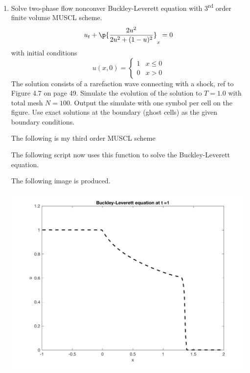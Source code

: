\documentclass[11pt, oneside]{article}
\begin{document}
\begin{enumerate}
  \item %
    Solve two-phase flow nonconver Buckley-Leverett equation with
    3\textsuperscript{rd} order finite volume MUSCL scheme.
    \[
      u_t + \p{\frac{2u^2}{2u^2 + (1 - u)^2}}_x = 0
    \]
    with initial conditions
    \[
      u(x, 0) =
      \begin{cases}
        1 & x \le 0 \\
        0 & x > 0
      \end{cases}
    \]
    The solution consists of a rarefaction wave connecting with a shock, ref
    to Figure 4.7 on page 49.
    Simulate the evolution of the solution to $T = 1.0$ with total mesh
    $N = 100$.
    Output the simulate with one symbol per cell on the figure.
    Use exact solutions at the boundary (ghost cells) as the given boundary
    conditions.

    The following is my third order MUSCL scheme
    
    The following script now uses this function to solve the Buckley-Leverett equation.
    
    The following image is produced.
    \begin{center}
      \includegraphics[scale=0.8]{Figures/07_01.png}
    \end{center}
\end{enumerate}
\end{document}
